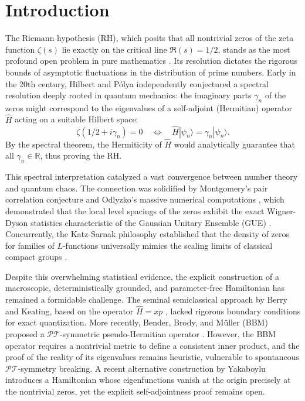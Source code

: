 \documentclass[aps,prl,preprint,superscriptaddress,floatfix]{revtex4-2}
\begin{document}
\maketitle

\section{Introduction}

The Riemann hypothesis (RH), which posits that all nontrivial zeros of the zeta function $\zeta(s)$ lie exactly on the critical line $\Re(s) = 1/2$, stands as the most profound open problem in pure mathematics \cite{Riemann1859}. Its resolution dictates the rigorous bounds of asymptotic fluctuations in the distribution of prime numbers. Early in the 20th century, Hilbert and P\'olya independently conjectured a spectral resolution deeply rooted in quantum mechanics: the imaginary parts $\gamma_n$ of the zeros might correspond to the eigenvalues of a self-adjoint (Hermitian) operator $\hat{H}$ acting on a suitable Hilbert space:
\begin{equation}
\zeta(1/2 + i\gamma_n) = 0 \quad \Longleftrightarrow \quad \hat{H}|\psi_n\rangle = \gamma_n |\psi_n\rangle.
\end{equation}
By the spectral theorem, the Hermiticity of $\hat{H}$ would analytically guarantee that all $\gamma_n \in \mathbb{R}$, thus proving the RH.

This spectral interpretation catalyzed a vast convergence between number theory and quantum chaos. The connection was solidified by Montgomery's pair correlation conjecture \cite{Montgomery1973} and Odlyzko's massive numerical computations \cite{Odlyzko2001}, which demonstrated that the local level spacings of the zeros exhibit the exact Wigner-Dyson statistics characteristic of the Gaussian Unitary Ensemble (GUE) \cite{Bohigas1984}. Concurrently, the Katz-Sarnak philosophy established that the density of zeros for families of $L$-functions universally mimics the scaling limits of classical compact groups \cite{KatzSarnak1999}.

Despite this overwhelming statistical evidence, the explicit construction of a macroscopic, deterministically grounded, and parameter-free Hamiltonian has remained a formidable challenge. The seminal semiclassical approach by Berry and Keating, based on the operator $\hat{H} = xp$ \cite{BerryKeating1999}, lacked rigorous boundary conditions for exact quantization. More recently, Bender, Brody, and M\"uller (BBM) proposed a $\mathcal{PT}$-symmetric pseudo-Hermitian operator \cite{Bender2017}. However, the BBM operator requires a nontrivial metric to define a consistent inner product, and the proof of the reality of its eigenvalues remains heuristic, vulnerable to spontaneous $\mathcal{PT}$-symmetry breaking. A recent alternative construction by Yakaboylu \cite{Yakaboylu2024} introduces a Hamiltonian whose eigenfunctions vanish at the origin precisely at the nontrivial zeros, yet the explicit self-adjointness proof remains open.
\end{document}
